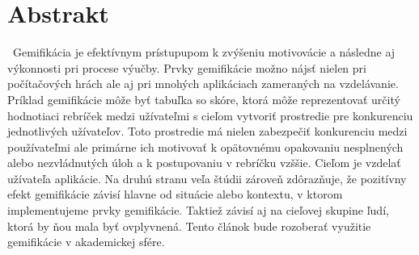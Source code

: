 \section{Abstrakt}\label{abstrakt}
\indent~Gemifikácia je efektívnym prístupupom k zvýšeniu motivovácie a následne aj výkonnosti
pri procese výučby. Prvky gemifikácie možno nájsť nielen pri počítačových hrách ale aj 
pri mnohých aplikáciach zameraných na vzdelávanie. Príklad gemifikácie môže byť tabuľka so skóre,
ktorá môže reprezentovať určitý hodnotiaci rebríček medzi užívateľmi s cieľom vytvoriť prostredie 
pre konkurenciu jednotlivých užívateľov. Toto prostredie má nielen zabezpečiť konkurenciu medzi používateľmi 
ale primárne ich motivovať k opätovnému opakovaniu nesplnených alebo nezvládnutých úloh
a k postupovaniu v rebríčku vzššie. Cieľom je vzdelať užívateľa aplikácie.
Na druhú stranu veľa štúdii zároveň zdôrazňuje, že pozitívny efekt gemifikácie
závisí hlavne od situácie alebo kontextu, v ktorom implementujeme prvky gemifikácie. 
Taktiež závisí aj na cieľovej skupine ľudí, ktorá by ňou mala byť ovplyvnená.
Tento článok bude rozoberať využitie gemifikácie v akademickej sfére.

